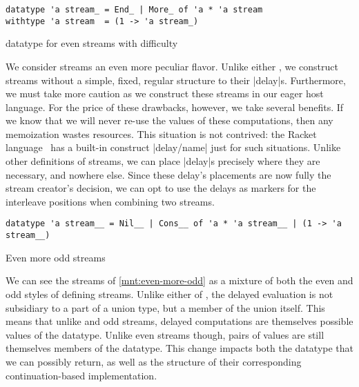 \documentclass[screen,anonymous,review,draft,natbib=false]{acmart} %
\begin{document}
\begin{listing}
\begin{verbatim}
datatype 'a stream_ = End_ | More_ of 'a * 'a stream
withtype 'a stream  = (1 -> 'a stream_)
\end{verbatim}
\caption{ datatype for even streams with difficulty}
\label{mnt:even-streams-with-difficulty}
\end{listing}

We consider streams an even more peculiar flavor. Unlike either
\citeauthor{wadler1998add,danvy2002unifying}, we construct streams
without a simple, fixed, regular structure to their
\rackinline|delay|s. Furthermore, we must take more caution as we
construct these streams in our eager host language. For the price of
these drawbacks, however, we take several benefits. If we know that we
will never re-use the values of these computations, then any
memoization wastes resources. This situation is not contrived: the
Racket language~\cite{flatt2010reference} has a built-in construct
\rackinline|delay/name| just for such situations. Unlike other
definitions of streams, we can place \rackinline|delay|s precisely
where they are necessary, and nowhere else. Since these delay's
placements are now fully the stream creator's decision, we can opt to
use the delays as markers for the interleave positions when combining
two streams.

\begin{listing}
\begin{verbatim}
datatype 'a stream__ = Nil__ | Cons__ of 'a * 'a stream__ | (1 -> 'a stream__)
\end{verbatim}
\caption{Even more odd streams}
\label{mnt:even-more-odd}
\end{listing}

We can see the streams of \cref{mnt:even-more-odd} as a mixture of
both the even and odd styles of defining streams. Unlike either of
, the delayed evaluation is not subsidiary to
a part of a union type, but a member of the union itself. This means
that unlike  and
\citeauthor{wadler1998add} odd streams, delayed computations are
themselves possible values of the datatype. Unlike
\citeauthor{wadler1998add} even streams though, pairs of values are
still themselves members of the datatype. This change impacts both the
datatype that we can possibly return, as well as the structure of
their corresponding continuation-based implementation.
\end{document}
